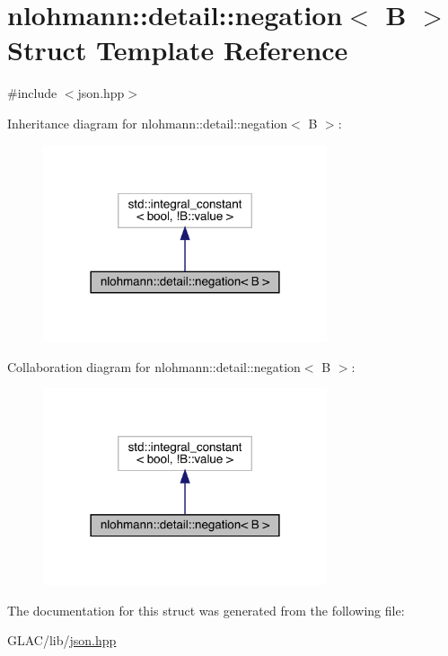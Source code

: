 \hypertarget{structnlohmann_1_1detail_1_1negation}{}\section{nlohmann\+::detail\+::negation$<$ B $>$ Struct Template Reference}
\label{structnlohmann_1_1detail_1_1negation}


{\ttfamily \#include $<$json.\+hpp$>$}



Inheritance diagram for nlohmann\+::detail\+::negation$<$ B $>$\+:\nopagebreak
\begin{figure}[H]
\begin{center}
\leavevmode
\includegraphics[width=237pt]{structnlohmann_1_1detail_1_1negation__inherit__graph}
\end{center}
\end{figure}


Collaboration diagram for nlohmann\+::detail\+::negation$<$ B $>$\+:\nopagebreak
\begin{figure}[H]
\begin{center}
\leavevmode
\includegraphics[width=237pt]{structnlohmann_1_1detail_1_1negation__coll__graph}
\end{center}
\end{figure}


The documentation for this struct was generated from the following file\+:\begin{DoxyCompactItemize}
\item 
G\+L\+A\+C/lib/\mbox{\hyperlink{json_8hpp}{json.\+hpp}}\end{DoxyCompactItemize}
